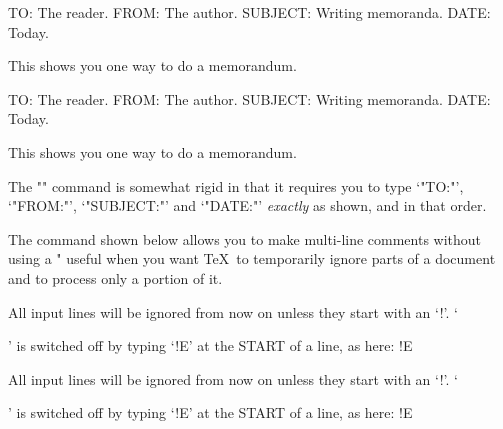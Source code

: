 \bigskip
{}
\beginex
\memo
TO: The reader.
FROM: The author.
SUBJECT: Writing memoranda.
DATE: Today.

This shows you one way to do a memorandum.
\bigskip
\centerline{}
\endex
\beginliteral
\memo
TO: The reader.
FROM: The author.
SUBJECT: Writing memoranda.
DATE: Today.

This shows you one way to do a memorandum.
\bigskip
\centerline{}
\endliteral
\noindent The "\memo" command is somewhat rigid in that it requires
you to type `"TO:"', `"FROM:"', `"SUBJECT:"' and `"DATE:"' {\sl exactly\/}
as shown, and in that order.
\endpage

\newpage
{}
The command shown below allows you to make multi-line
comments without using a "%
useful when you want \TeX\ to temporarily ignore parts of a document
and to process only a portion of it.
\ignore
All input lines will be ignored from now on
unless they start with an `!'.
`\ignore' is switched off by typing `!E' at
the START of a line, as here:
!E
\beginliteral
\ignore
All input lines will be ignored from now on
unless they start with an `!'.
`\ignore' is switched off by typing `!E' at
the START of a line, as here:
!E
\endliteral

